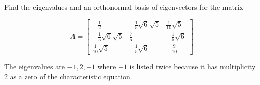 \documentclass{ximera}
\begin{document}
 \begin{problem}\label{prb:9.12} Find the eigenvalues and an orthonormal basis of eigenvectors for the
matrix

\begin{equation*}
A = \left[
\begin{array}{ccc}
- \frac{1}{2} & - \frac{1}{5}\sqrt{6}\sqrt{5} &
 \frac{1}{10}\sqrt{5} \\
- \frac{1}{5}\sqrt{6}\sqrt{5} &  \frac{7}{5} & -
 \frac{1}{5}\sqrt{6} \\
 \frac{1}{10}\sqrt{5} & - \frac{1}{5}\sqrt{6} & -
 \frac{9}{10}
\end{array}
\right]
\end{equation*}

\begin{hint} 
The eigenvalues are $-1,2,-1$ where $-1$ is listed twice
because it has multiplicity 2 as a zero of the characteristic equation.


\end{hint}
\end{problem}
\end{document}
